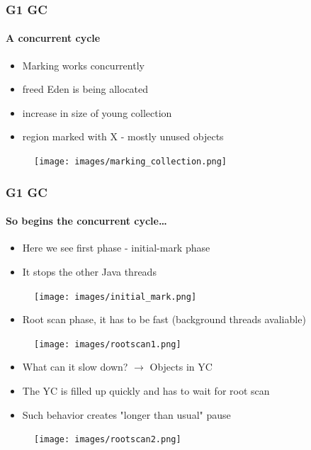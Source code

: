 \documentclass{beamer}
\begin{document}
\begin{frame}
    \frametitle{G1 GC}
    \framesubtitle{A concurrent cycle}
    
    \begin{itemize}
        \item Marking works concurrently
        \item freed Eden is being allocated 
        \item increase in size of young collection
        \item region marked with X - mostly unused objects
    \end{itemize}
    \begin{figure}
        \texttt{[image: images/marking\_collection.png]}
    \end{figure}
\end{frame}
\begin{frame}
    \frametitle{G1 GC}
    \framesubtitle{So begins the concurrent cycle\dots}
    \begin{itemize}
        \item Here we see first phase - initial-mark phase
        \item It stops the other Java threads  
    \end{itemize}
    \begin{figure}
        \texttt{[image: images/initial\_mark.png]}
    \end{figure}
    \begin{itemize}
        \item Root scan phase, it has to be fast (background threads avaliable) 
        
    \end{itemize}

    \begin{figure}
        \texttt{[image: images/rootscan1.png]}
    \end{figure}
    \begin{itemize}
        \item What can it slow down? $\rightarrow$ Objects in YC
        \item The YC is filled up quickly and has to wait for root scan
        \item Such behavior creates "longer than usual" pause
    \end{itemize}
    \begin{figure}
        \texttt{[image: images/rootscan2.png]}
    \end{figure}
\end{frame}
\end{document}
